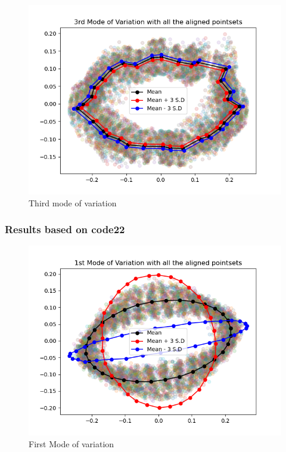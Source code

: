 \documentclass{article}
\begin{document}
\begin{figure}[H]
    \centerline{\includegraphics[scale=0.45]{../results/ellipses/mean-and-third-mode.png}}
    \caption{Third mode of variation}
\end{figure}

\newpage
\thispagestyle{fancy}

\subsubsection{Results based on code22}
\begin{figure}[H]
    \centerline{\includegraphics[scale=0.45]{../results/ellipses/mean-and-first-mode_2.png}}
    \caption{First Mode of variation}
\end{figure}
\end{document}
